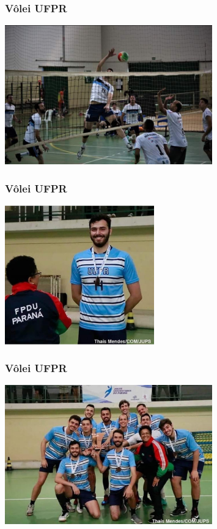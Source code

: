 \documentclass[10pt,
  aspectratio=169,
  serif,
  mathserif,
  professionalfont,
  compress,
  handout,
  ]{beamer}\usepackage[]{graphicx}\usepackage[]{color}
\begin{document}
\begin{frame}

\frametitle{Vôlei UFPR}

\begin{center}
  \includegraphics[height=6cm]{img/volei4.png}
\end{center}

\end{frame}


\begin{frame}

\frametitle{Vôlei UFPR}

\begin{center}
  \includegraphics[height=6cm]{img/volei6.jpeg}
\end{center}

\end{frame}


\begin{frame}

\frametitle{Vôlei UFPR}

\begin{center}
  \includegraphics[height=6cm]{img/volei7.jpeg}
\end{center}

\end{frame}
\end{document}
